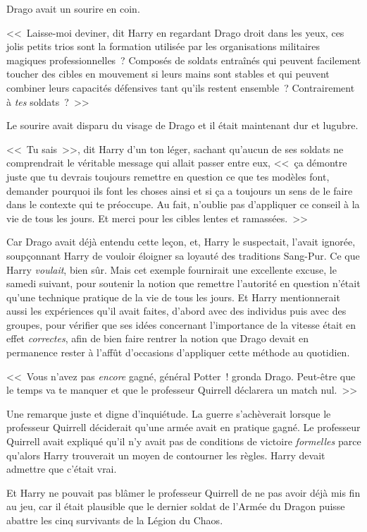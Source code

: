 Drago avait un sourire en coin.

<<~Laisse-moi deviner, dit Harry en regardant Drago droit dans les yeux, ces jolis petits trios sont la formation utilisée par les organisations militaires magiques professionnelles~? Composés de soldats entraînés qui peuvent facilement toucher des cibles en mouvement si leurs mains sont stables et qui peuvent combiner leurs capacités défensives tant qu'ils restent ensemble~? Contrairement à \emph{tes} soldats~?~>>

Le sourire avait disparu du visage de Drago et il était maintenant dur et lugubre.

<<~Tu sais~>>, dit Harry d'un ton léger, sachant qu'aucun de ses soldats ne comprendrait le véritable message qui allait passer entre eux, <<~ça démontre juste que tu devrais toujours remettre en question ce que tes modèles font, demander pourquoi ils font les choses ainsi et si ça a toujours un sens de le faire dans le contexte qui te préoccupe. Au fait, n'oublie pas d'appliquer ce conseil à la vie de tous les jours. Et merci pour les cibles lentes et ramassées.~>>

Car Drago avait déjà entendu cette leçon, et, Harry le suspectait, l'avait ignorée, soupçonnant Harry de vouloir éloigner sa loyauté des traditions Sang-Pur. Ce que Harry \emph{voulait}, bien sûr. Mais cet exemple fournirait une excellente excuse, le samedi suivant, pour soutenir la notion que remettre l'autorité en question n'était qu'une technique pratique de la vie de tous les jours. Et Harry mentionnerait aussi les expériences qu'il avait faites, d'abord avec des individus puis avec des groupes, pour vérifier que ses idées concernant l'importance de la vitesse était en effet \emph{correctes}, afin de bien faire rentrer la notion que Drago devait en permanence rester à l'affût d'occasions d'appliquer cette méthode au quotidien.

<<~Vous n'avez pas \emph{encore} gagné, général Potter~! gronda Drago. Peut-être que le temps va te manquer et que le professeur Quirrell déclarera un match nul.~>>

Une remarque juste et digne d'inquiétude. La guerre s'achèverait lorsque le professeur Quirrell déciderait qu'une armée avait en pratique gagné. Le professeur Quirrell avait expliqué qu'il n'y avait pas de conditions de victoire \emph{formelles} parce qu'alors Harry trouverait un moyen de contourner les règles. Harry devait admettre que c'était vrai.

Et Harry ne pouvait pas blâmer le professeur Quirrell de ne pas avoir déjà mis fin au jeu, car il était plausible que le dernier soldat de l'Armée du Dragon puisse abattre les cinq survivants de la Légion du Chaos.

